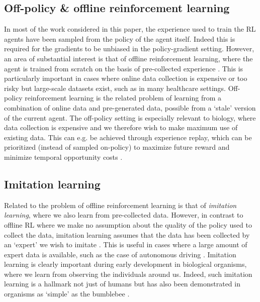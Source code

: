 \subsection{Off-policy \& offline reinforcement learning}
\label{sec:off-policy}
In most of the work considered in this paper, the experience used to train the RL agents have been sampled from the policy of the agent itself.
Indeed this is required for the gradients to be unbiased in the policy-gradient setting.
However, an area of substantial interest is that of offline reinforcement learning, where the agent is trained from scratch on the basis of pre-collected experience \citep{levine2020offline}.
This is particularly important in cases where online data collection is expensive or too risky but large-scale datasets exist, such as in many healthcare settings.
Off-policy reinforcement learning is the related problem of learning from a combination of online data and pre-generated data, possible from a `stale' version of the current agent.
The off-policy setting is especially relevant to biology, where data collection is expensive and we therefore wish to make maximum use of existing data.
This can e.g. be achieved through experience replay, which can be prioritized (instead of sampled on-policy) to maximize future reward and minimize temporal opportunity costs \citep{mattar2018prioritized, agrawal2022temporal}.

\subsection{Imitation learning}
\label{sec:imitation}
Related to the problem of offline reinforcement learning is that of \emph{imitation learning}, where we also learn from pre-collected data.
However, in contrast to offline RL where we make no assumption about the quality of the policy used to collect the data, imitation learning assumes that the data has been collected by an `expert' we wish to imitate \citep{levine2020offline}.
This is useful in cases where a large amount of expert data is available, such as the case of autonomous driving \citep{pan2017agile}.
Imitation learning is clearly important during early development in biological organisms, where we learn from observing the individuals around us.
Indeed, such imitation learning is a hallmark not just of humans but has also been demonstrated in organisms as `simple' as the bumblebee \citep{loukola2017bumblebees}.

